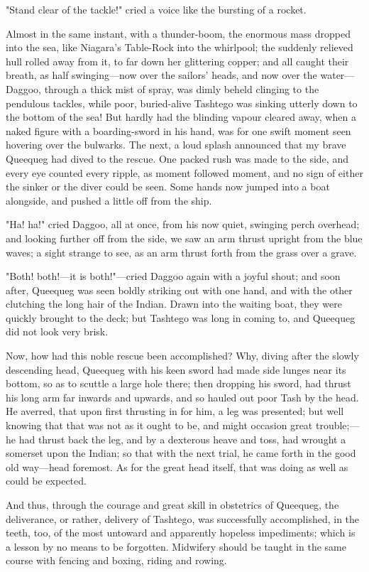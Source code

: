 \documentclass{article}
\begin{document}
"Stand clear of the tackle!" cried a voice like the bursting of a rocket.

Almost in the same instant, with a thunder-boom, the enormous mass dropped into the sea, like Niagara's Table-Rock into the whirlpool; the suddenly relieved hull rolled away from it, to far down her glittering copper; and all caught their breath, as half swinging—now over the sailors' heads, and now over the water—Daggoo, through a thick mist of spray, was dimly beheld clinging to the pendulous tackles, while poor, buried-alive Tashtego was sinking utterly down to the bottom of the sea! But hardly had the blinding vapour cleared away, when a naked figure with a boarding-sword in his hand, was for one swift moment seen hovering over the bulwarks. The next, a loud splash announced that my brave Queequeg had dived to the rescue. One packed rush was made to the side, and every eye counted every ripple, as moment followed moment, and no sign of either the sinker or the diver could be seen. Some hands now jumped into a boat alongside, and pushed a little off from the ship.

"Ha! ha!" cried Daggoo, all at once, from his now quiet, swinging perch overhead; and looking further off from the side, we saw an arm thrust upright from the blue waves; a sight strange to see, as an arm thrust forth from the grass over a grave.

"Both! both!—it is both!"—cried Daggoo again with a joyful shout; and soon after, Queequeg was seen boldly striking out with one hand, and with the other clutching the long hair of the Indian. Drawn into the waiting boat, they were quickly brought to the deck; but Tashtego was long in coming to, and Queequeg did not look very brisk.

Now, how had this noble rescue been accomplished? Why, diving after the slowly descending head, Queequeg with his keen sword had made side lunges near its bottom, so as to scuttle a large hole there; then dropping his sword, had thrust his long arm far inwards and upwards, and so hauled out poor Tash by the head. He averred, that upon first thrusting in for him, a leg was presented; but well knowing that that was not as it ought to be, and might occasion great trouble;—he had thrust back the leg, and by a dexterous heave and toss, had wrought a somerset upon the Indian; so that with the next trial, he came forth in the good old way—head foremost. As for the great head itself, that was doing as well as could be expected.

And thus, through the courage and great skill in obstetrics of Queequeg, the deliverance, or rather, delivery of Tashtego, was successfully accomplished, in the teeth, too, of the most untoward and apparently hopeless impediments; which is a lesson by no means to be forgotten. Midwifery should be taught in the same course with fencing and boxing, riding and rowing.
\end{document}
